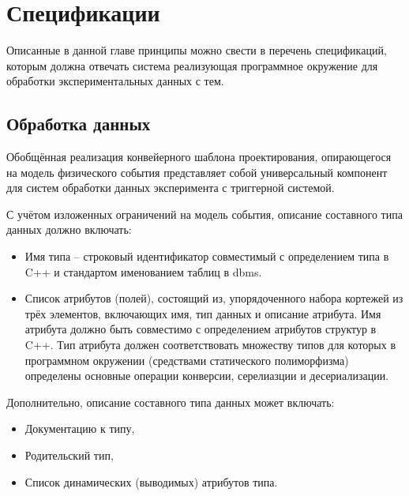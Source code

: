 \section{Спецификации}

Описанные в данной главе принципы можно свести в перечень
спецификаций, которым должна отвечать система реализующая
программное окружение для обработки экспериментальных
данных с тем.

\subsection{Обработка данных}

Обобщённая реализация конвейерного шаблона проектирования, опирающегося
на модель физического события представляет собой универсальный компонент
для систем обработки данных эксперимента с триггерной
системой.

С учётом изложенных ограничений на модель события,
описание составного типа данных должно включать:
\begin{itemize}
    \item Имя типа -- строковый идентификатор совместимый
    с определением типа в C++ и стандартом именованием таблиц
    в \acrshort{dbms}.
    \item Список атрибутов (полей), состоящий из,
    упорядоченного набора кортежей из трёх элементов, включающих
    имя, тип данных и описание атрибута. Имя атрибута
    должно быть совместимо с определением атрибутов структур в C++.
    Тип атрибута должен соответствовать множеству типов для которых в
    программном окружении (средствами статического полиморфизма) определены
    основные операции конверсии, серелиазции и десериализации.
\end{itemize}
Дополнительно, описание составного типа данных может включать:
\begin{itemize}
    \item Документацию к типу,
    \item Родительский тип,
    \item Список динамических (выводимых) атрибутов типа.
\end{itemize}

